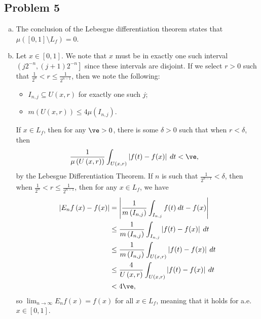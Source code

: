 \documentclass[10pt]{mypackage}
\begin{document}
\subsection{Problem 5}%
\begin{enumerate}[(a)]
  \item The conclusion of the Lebesgue differentiation theorem states that $\mu\left( [0,1]\setminus L_f \right) = 0$.
  \item Let $x\in [0,1]$. We note that $x$ must be in exactly one such interval $\left( j2^{-n},\left( j+1 \right)2^{-n} \right]$ since these intervals are disjoint. If we select $r > 0$ such that $\frac{1}{2^{n}} < r \leq \frac{1}{2^{n-1}}$, then we note the following:
    \begin{itemize}
      \item $I_{n,j}\subseteq U\left( x,r \right)$ for exactly one such $j$;
      \item $m\left( U\left( x,r \right) \right) \leq 4\mu\left( I_{n,j} \right)$.
    \end{itemize}
    If $x\in L_f$, then for any $\ve > 0$, there is some $\delta > 0$ such that when $r < \delta$, then
    \begin{align*}
      \frac{1}{\mu\left( U\left( x,r \right) \right)} \int_{U\left( x,r \right)}^{} \left\vert f(t)-f(x) \right\vert\:dt &< \ve,
    \end{align*}
    by the Lebesgue Differentiation Theorem. If $n$ is such that $\frac{1}{2^{n-1}} < \delta$, then when $\frac{1}{2^{n}} < r \leq \frac{1}{2^{n-1}}$, then for any $x\in L_f$, we have
    \begin{align*}
      \left\vert E_nf\left( x \right) - f(x) \right\vert &= \left\vert \frac{1}{m\left( I_{n,j} \right)}\int_{I_{n,j}}^{} f(t)\:dt - f(x) \right\vert\\
                                                         &\leq \frac{1}{m\left( I_{n,j} \right)} \int_{I_{n,j}}^{} \left\vert f(t)-f(x) \right\vert\:dt\\
                                                         &\leq \frac{1}{m\left( I_{n,j} \right)} \int_{U\left( x,r \right)}^{} \left\vert f(t)-f(x) \right\vert\:dt\\
                                                         &\leq \frac{4}{U\left( x,r \right)} \int_{U\left( x,r \right)}^{} \left\vert f(t)-f(x) \right\vert\:dt\\
                                                         &< 4\ve,
    \end{align*}
    so $\lim_{n\rightarrow\infty}E_nf(x) = f(x)$ for all $x\in L_f$, meaning that it holds for a.e. $x\in [0,1]$.
\end{enumerate}
\end{document}

